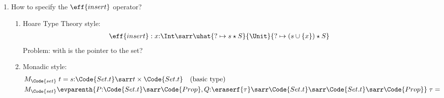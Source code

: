 \begin{example}[Iterators]
\begin{enumerate}
\begin{enumerate}
\begin{align*}
                & \eff{deref}: l{:}\tvar{a}\;\Code{ref} \sarr M_{\Code{ref}}\evparenth{\qt{\vnu{:}\Code{Map.t}}{l \in \Dom{\vnu}}, \qt{r{:}\tvar{a},m{:}\Code{Map.t},\vnu{:}\Code{Map.t}}{r = m[l] \land \vnu = m}} \;\urt{\tvar{a}}{\top} \\
                & \eff{updateRef}: l{:}\tvar{a}\;\Code{ref} \sarr y{:}\tvar{a} \sarr M_{\Code{ref}}\evparenth{\qt{\vnu{:}\Code{Map.t}}{l \in \Dom{\vnu}}, \qt{\_,m{:}\Code{Map.t},\vnu{:}\Code{Map.t}}{\vnu = m[l \mapsto y]}} \;\Unit
            \end{align*}
            Problem: it seems that not all values in the qualifiers are reachable -- is this a essential problem of underapproximate monad? Kind of like backward reasoning problem in IL.
            \item Trace-based style:
            \begin{align*}
                & \eff{ref}: x{:}\tvar{a} \sarr H{:}\uhat{\top}{l{:}\urt{\tvar{a}\;\Code{ref}}{\forall e{:}\eff{ref}. e \in H \impl e.\I{label} \neq \vnu}}{\vnu = H \listconcat \msgA{ref}{x\;l}} \\
                & \eff{deref}: l{:}\tvar{a}\;\Code{ref} \sarr H{:}\uhat{\exists x{:}\tvar{a}.\msg{ref}{x\;l} \in \vnu}{\urt{\tvar{a}}{ \exists x. \msg{ref}{x\;l} \in H \land \neg(\exists y. \msg{ref}{l\;y} \in H) \lor ... }}{...}\\
                & \eff{updateRef}: l{:}\tvar{a}\;\Code{ref} \sarr y{:}\tvar{a} \sarr H{:}\uhat{\exists x{:}\tvar{a}.\msg{ref}{x\;l} \in \vnu}{\Unit}{...}
            \end{align*}
        \end{enumerate}
        \item How to specify the $\eff{insert}$ operator?
        \begin{enumerate}
            \item Hoare Type Theory style:
            \begin{align*}
                & \eff{insert}: x{:}\Int \sarr \uhat{? \mapsto s \star S}{\Unit}{? \mapsto (s \cup \{x\}) \star S}
            \end{align*}\noindent Problem: with is the pointer to the set?
            \item Monadic style:
            \begin{align*}
                & M_{\Code{set}}\;t = s{:}\Code{Set.t} \sarr t \times \Code{Set.t}  \quad \text{(basic type)} \\
                & M_{\Code{set}}\evparenth{P {:} \Code{Set.t}\sarr\Code{Prop}, Q {:}\eraserf{\tau}\sarr \Code{Set.t}\sarr \Code{Set.t}\sarr \Code{Prop}}\;\tau = \\

\end{align*}
\end{enumerate}
\end{enumerate}
\end{example}
